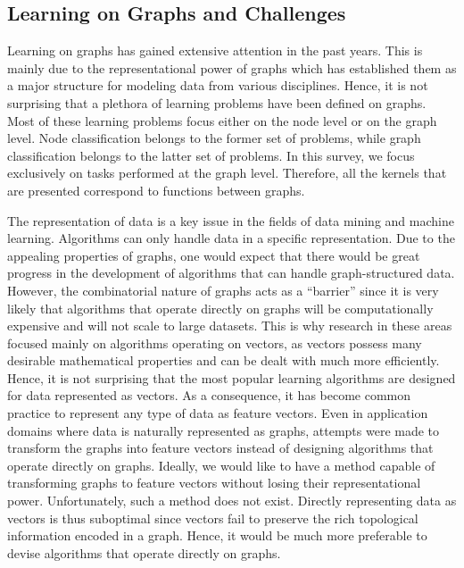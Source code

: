 \documentclass[twoside,11pt]{article}
\begin{document}
\subsection{Learning on Graphs and Challenges}
Learning on graphs has gained extensive attention in the past years.
This is mainly due to the representational power of graphs which has established them as a major structure for modeling data from various disciplines.
Hence, it is not surprising that a plethora of learning problems have been defined on graphs. 
Most of these learning problems focus either on the node level or on the graph level.
Node classification belongs to the former set of problems, while graph classification belongs to the latter set of problems.
In this survey, we focus exclusively on tasks performed at the graph level.
Therefore, all the kernels that are presented correspond to functions between graphs.

The representation of data is a key issue in the fields of data mining and machine learning.
Algorithms can only handle data in a specific representation.
Due to the appealing properties of graphs, one would expect that there would be great progress in the development of algorithms that can handle graph-structured data.
However, the combinatorial nature of graphs acts as a ``barrier'' since it is very likely that algorithms that operate directly on graphs will be computationally expensive and will not scale to large datasets.
This is why research in these areas focused mainly on algorithms operating on vectors, as vectors possess many desirable mathematical properties and can be dealt with much more efficiently.
Hence, it is not surprising that the most popular learning algorithms are designed for data represented as vectors.
As a consequence, it has become common practice to represent any type of data as feature vectors.
Even in application domains where data is naturally represented as graphs, attempts were made to transform the graphs into feature vectors instead of designing algorithms that operate directly on graphs.
Ideally, we would like to have a method capable of transforming graphs to feature vectors without losing their representational power.
Unfortunately, such a method does not exist.
Directly representing data as vectors is thus suboptimal since vectors fail to preserve the rich topological information encoded in a graph.
Hence, it would be much more preferable to devise algorithms that operate directly on graphs.
\end{document}
